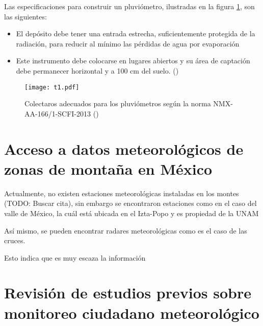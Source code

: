 Las especificaciones para construir un pluviómetro, ilustradas en la figura \ref{t1}, son las siguientes:
\begin{itemize}
    \item El depósito debe tener una entrada estrecha, suficientemente protegida de la radiación, para reducir al mínimo las pérdidas de agua por evaporación
    \item Este instrumento debe colocarse en lugares abiertos y su área de captación debe permanecer horizontal y a 100 cm del suelo. (\cite{se2013})
\end{itemize}

\begin{figure}[h!]
\centering
  \texttt{[image: t1.pdf]}
  \caption{Colectaros adecuados para los pluviómetros según la norma NMX-AA-166/1-SCFI-2013 (\cite{se2013})}
  \label{t1}
\end{figure}



















\newpage
\section{Acceso a datos meteorológicos de zonas de montaña en México}

Actualmente, no existen estaciones meteorológicas instaladas en los montes (TODO: Buscar cita), sin embargo se encontraron estaciones como en el caso del valle de México, la cuál está ubicada en el Izta-Popo y es propiedad de la UNAM

Así mismo, se pueden encontrar radares meteorológicas como es el caso de las cruces. 

Esto indica que es muy escaza la información

















\newpage
\section{Revisión de estudios previos sobre monitoreo ciudadano meteorológico}

